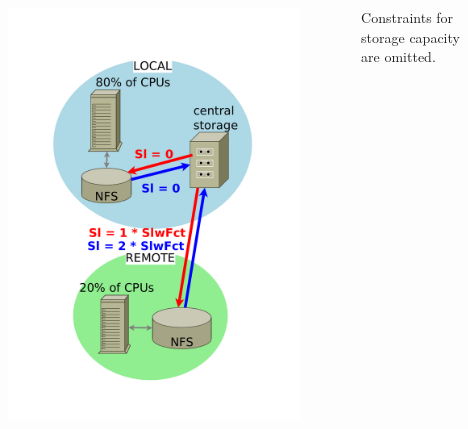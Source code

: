 \documentclass{beamer}
\begin{document}
\begin{frame}
\begin{columns}[c]
		\begin{figure}
			\begin{center}
			    \vspace{-20mm}
				\includegraphics [width=1.2\textwidth]{pic/test_environment2.pdf}
			\end{center}
			\end{figure} 	 
\vspace{-1cm}
\begin{tiny}
\begin{center}
Constraints for storage capacity are omitted.
\end{center}
\end{tiny}
 	\end{columns} 	
\end{frame}
\end{document}
